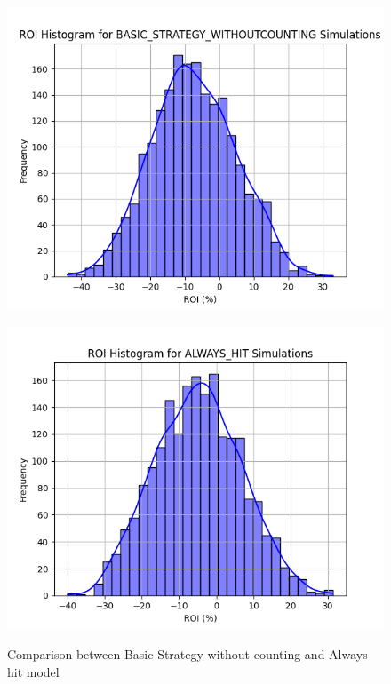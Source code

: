 \documentclass[a4paper,12pt]{report}
\begin{document}
\begin{figure}[h]
    \begin{minipage}{0.45\textwidth}
        \centering
        \includegraphics[scale=0.4]{figures/graphs/bswc_roi.png}
        \label{fig:ah_roi_left}
    \end{minipage}
    \begin{minipage}{0.45\textwidth}
        \includegraphics[scale=0.4]{figures/graphs/ah_roi.png}
        \label{fig:bswc_roi_right}
    \end{minipage}
    \label{fig:comparison_roi}
    \caption{Comparison between Basic Strategy without counting and Always hit model}
\end{figure}
\end{document}
